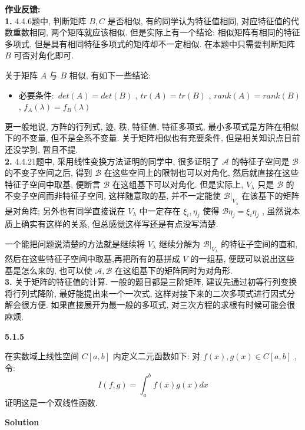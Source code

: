 \documentclass[11pt,a4paper,openany,oneside]{book}
\newcommand\Solution{\noindent\textbf{\textsf{Solution}}\par\medskip}
\begin{document}
\newpage
\textbf{作业反馈:} \\ 

\textbf{1.} 4.4.6题中, 判断矩阵 $ B, C $ 是否相似, 有的同学认为特征值相同, 对应特征值的代数重数相同, 两个矩阵就应该相似. 但是实际上有一个结论: 相似矩阵有相同的特征多项式, 但是具有相同特征多项式的矩阵却不一定相似. 在本题中只需要判断矩阵 $ B $ 可否对角化即可. 

关于矩阵 $ A $ 与 $ B $ 相似, 有如下一些结论:
\begin{itemize}
	\item 必要条件:\  $ det(A) = det(B) $ ,  $ tr(A) =tr(B) $ ,  $ rank(A) = rank(B) $ ,  $ f_A(\lambda) = f_B(\lambda) $ 
\end{itemize}
更一般地说, 方阵的行列式, 迹, 秩, 特征值, 特征多项式, 最小多项式是方阵在相似下的不变量, 但不是全系不变量. 关于矩阵相似也有充要条件, 但是相关知识点目前还没学到, 暂且不提.  \\ 

\textbf{2.} 4.4.21题中, 采用线性变换方法证明的同学中, 很多证明了 $ \mathcal{A} $ 的特征子空间是 $ \mathcal{B} $ 的不变子空间之后, 得到 $ \mathcal{B} $ 在这些空间上的限制也可以对角化, 然后就直接在这些特征子空间中取基, 便断言 $ \mathcal{B} $ 在这组基下可以对角化. 但是实际上,  $ V_{\lambda} $ 只是 $ \mathcal{B} $ 的不变子空间而非特征子空间, 这样随意取的基, 并不一定能使 $ \mathcal{B}|_{V_{\lambda}} $ 在该基下的矩阵是对角阵; 另外也有同学直接说在 $ V_{\lambda} $ 中一定存在 $ \xi_i, \eta_j $ 使得 $ \mathcal{B}\eta_j = \xi_i\eta_j $ , 虽然说本质上确实有这样的关系, 但总感觉这样写还是有点没写清楚.

一个能把问题说清楚的方法就是继续将 $ V_{\lambda} $ 继续分解为 $ \mathcal{B}|_{V_{\lambda}} $ 的特征子空间的直和, 然后在这些特征子空间中取基,再把所有的基拼成 $ V $ 的一组基, 便既可以说出这些基是怎么来的, 也可以使 $ \mathcal{A}, \mathcal{B} $ 在这组基下的矩阵同时为对角形.  \\ 

\textbf{3.} 关于矩阵的特征值的计算. 一般的题目都是三阶矩阵, 建议先通过初等行列变换将行列式降阶, 最好能提出来一个一次式, 这样对接下来的二次多项式进行因式分解会很方便. 如果直接展开为最一般的多项式, 对三次方程的求根有时候可能会很麻烦. 


\begin{myexample}
	\textbf{5.1.5}

在实数域上线性空间 $ C[a,b] $ 内定义二元函数如下: 对 $ f(x), g(x) \in C[a,b] $ , 令:
 $$  I(f, g) = \int_a^b f(x)g(x) dx  $$ 
证明这是一个双线性函数.  \\

\end{myexample}
\Solution  
\end{document}
